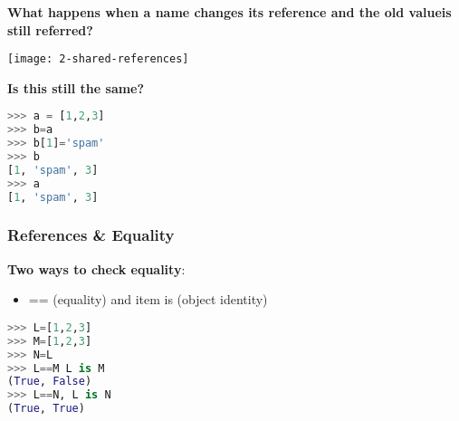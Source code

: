 \textbf{What happens when a name changes its reference and the old valueis still referred?}

\begin{center}
\texttt{[image: 2-shared-references]}
\end{center}

\textbf{Is this still the same?}

\begin{lstlisting}[language=Python]
>>> a = [1,2,3]  
>>> b=a
>>> b[1]='spam'
>>> b
[1, 'spam', 3]
>>> a
[1, 'spam', 3]
\end{lstlisting}

\subsubsection{References & Equality}

\textbf{Two ways to check equality}:

\begin{itemize}
	\item == (equality) and
	item is (object identity)
\end{itemize}

\begin{lstlisting}[language=Python]
>>> L=[1,2,3]
>>> M=[1,2,3]
>>> N=L
>>> L==M L is M
(True, False)
>>> L==N, L is N
(True, True)
\end{lstlisting}

